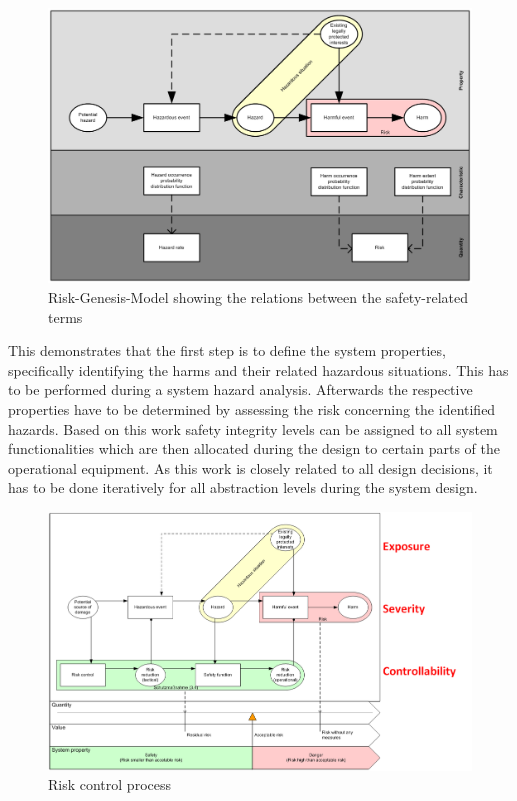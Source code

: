 \documentclass{template/openetcs_report}
\begin{document}
\begin{figure}[htbp]
\centering
\includegraphics[width=0.8\linewidth]{bld_2013-06-19_Risiko-Genese-Modell-eng-2-0_jw}
\caption{Risk-Genesis-Model showing the relations between the safety-related terms \cite{Schnieder.2010}}
\label{fig:Risiko-Genese-Modell-eng}
\end{figure}

This demonstrates that the first step is to define the system properties, specifically identifying the harms and their related hazardous situations. This has to be performed during a system hazard analysis. Afterwards the respective properties have to be determined by assessing the risk concerning the identified hazards. Based on this work safety integrity levels can be assigned to all system functionalities which are then allocated during the design to certain parts of the operational equipment. As this work is closely related to all design decisions, it has to be done iteratively for all abstraction levels during the system design. 

\begin{figure}[htbp]
\centering
\includegraphics[width=0.9\linewidth]{bld_2013-06-19_Risk-control-modell_1-0_jw}
\caption{Risk control process \cite{Schnieder.2013}}
\label{fig:Risk-control-modell-eng}
\end{figure}
\end{document}
